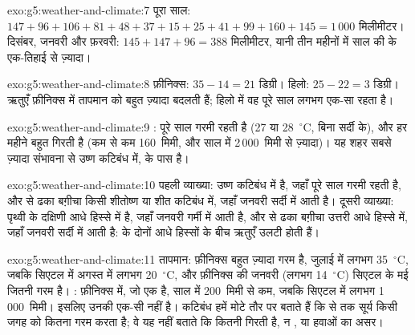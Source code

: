 \begin{solution}{exo:g5:weather-and-climate:7}
पूरा साल: $147 + 96 + 106 + 81 + 48 + 37 + 15 + 25 + 41 + 99 + 160 + 145
= 1\,000$ मिलीमीटर। दिसंबर, जनवरी और फ़रवरी:
$145 + 147 + 96 = 388$ मिलीमीटर, यानी तीन महीनों में साल की  के एक-तिहाई से
ज़्यादा।
\end{solution}

\begin{solution}{exo:g5:weather-and-climate:8}
फ़ीनिक्स: $35 - 14 = 21$ डिग्री। हिलो: $25 - 22 = 3$ डिग्री। ऋतुएँ फ़ीनिक्स में
तापमान को बहुत ज़्यादा बदलती हैं; हिलो में वह पूरे साल लगभग एक-सा
रहता है।
\end{solution}

\begin{solution}{exo:g5:weather-and-climate:9}
 : पूरे साल गरमी रहती है (27 या 28~$^\circ$C, बिना सर्दी के), और
हर महीने बहुत  गिरती है (कम से कम 160~मिमी, और साल में 2\,000~मिमी से
ज़्यादा)। यह शहर सबसे ज़्यादा संभावना से उष्ण कटिबंध में,  के पास
है।
\end{solution}

\begin{solution}{exo:g5:weather-and-climate:10}
पहली व्याख्या:   उष्ण कटिबंध में है, जहाँ पूरे साल गरमी रहती है, और 
से ढका बग़ीचा किसी शीतोष्ण या शीत कटिबंध में, जहाँ जनवरी सर्दी में आती है। दूसरी
व्याख्या:   पृथ्वी के दक्षिणी आधे हिस्से में है, जहाँ जनवरी गर्मी में आती
है, और  से ढका बग़ीचा उत्तरी आधे हिस्से में, जहाँ जनवरी सर्दी में आती है: 
के दोनों आधे हिस्सों के बीच ऋतुएँ
उलटी होती हैं।
\end{solution}

\begin{solution}{exo:g5:weather-and-climate:11}
तापमान: फ़ीनिक्स बहुत ज़्यादा गरम है, जुलाई में लगभग 35~$^\circ$C, जबकि सिएटल में
अगस्त में लगभग 20~$^\circ$C, और फ़ीनिक्स की जनवरी (लगभग
14~$^\circ$C) सिएटल के मई जितनी गरम है। : फ़ीनिक्स में, जो एक  है,
साल में 200~मिमी से कम, जबकि सिएटल में लगभग 1\,000~मिमी। इसलिए उनकी  एक-सी
नहीं है। कटिबंध हमें मोटे तौर पर बताते हैं कि  से  तक सूर्य किसी
जगह को कितना गरम करता है; वे यह नहीं बताते कि कितनी  गिरती है, न ,
 या हवाओं का असर।
\end{solution}
